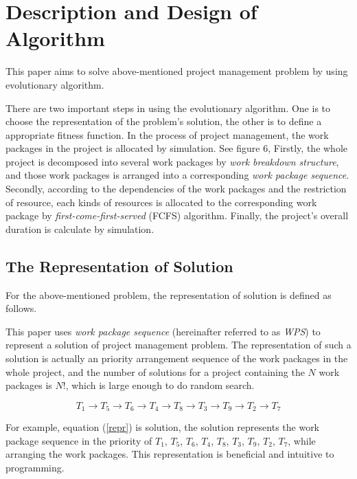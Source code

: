 %
%

\section{Description and Design of Algorithm}
%
This paper aims to solve above-mentioned project management problem by using
evolutionary algorithm.


There are two important steps in using the evolutionary algorithm. One is to
choose the representation of the problem's solution, the other is to define a
appropriate fitness function. In the process of project management, the work
packages in the project is allocated by simulation. See figure 6, Firstly, the
whole project is decomposed into several work packages by \emph{work breakdown
  structure}, and those work packages is arranged into a corresponding
\emph{work package sequence}. Secondly, according to the dependencies of the
work packages and the restriction of resource, each kinds of resources is
allocated to the corresponding work package by \emph{first-come-first-served}
(FCFS) algorithm. Finally, the project's overall duration is calculate by
simulation.


\subsection{The Representation of Solution}
%
For the above-mentioned problem, the representation of solution is defined as
follows.


This paper uses \emph{work package sequence} (hereinafter referred to as \emph{WPS}) to
represent a solution of project management problem. The representation of such a
solution is actually an priority arrangement sequence of the work packages in
the whole project, and the number of solutions for a project containing the $N$
work packages is $N!$, which is large enough to do random search.

\begin{equation}
  T_1 \rightarrow T_5 \rightarrow T_6 \rightarrow T_4 \rightarrow T_8
  \rightarrow T_3 \rightarrow T_9 \rightarrow T_2 \rightarrow T_7
  \label{repr}
\end{equation}

For example, equation (\ref{repr}) is solution, the solution represents the work
package sequence in the priority of $T_1$, $T_5$, $T_6$, $T_4$, $T_8$, $T_3$,
$T_9$, $T_2$, $T_7$, while arranging the work packages. This representation is
beneficial and intuitive to programming.


